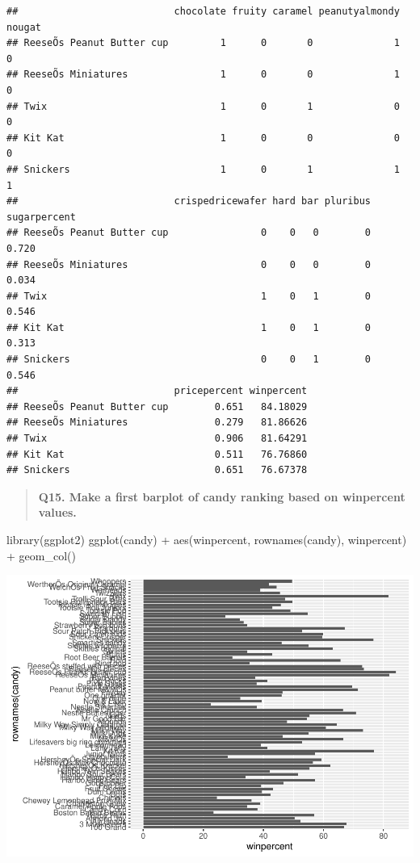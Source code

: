 \documentclass[
]{article}
\newenvironment{Shaded}{\begin{snugshade}}{\end{snugshade}}
\newcommand{\FunctionTok}[1]{\textcolor[rgb]{0.00,0.00,0.00}{#1}}
\newcommand{\NormalTok}[1]{#1}
\newcommand{\SpecialCharTok}[1]{\textcolor[rgb]{0.00,0.00,0.00}{#1}}
\begin{document}
\begin{verbatim}
##                           chocolate fruity caramel peanutyalmondy nougat
## ReeseÕs Peanut Butter cup         1      0       0              1      0
## ReeseÕs Miniatures                1      0       0              1      0
## Twix                              1      0       1              0      0
## Kit Kat                           1      0       0              0      0
## Snickers                          1      0       1              1      1
##                           crispedricewafer hard bar pluribus sugarpercent
## ReeseÕs Peanut Butter cup                0    0   0        0        0.720
## ReeseÕs Miniatures                       0    0   0        0        0.034
## Twix                                     1    0   1        0        0.546
## Kit Kat                                  1    0   1        0        0.313
## Snickers                                 0    0   1        0        0.546
##                           pricepercent winpercent
## ReeseÕs Peanut Butter cup        0.651   84.18029
## ReeseÕs Miniatures               0.279   81.86626
## Twix                             0.906   81.64291
## Kit Kat                          0.511   76.76860
## Snickers                         0.651   76.67378
\end{verbatim}

\begin{quote}
\textbf{Q15. Make a first barplot of candy ranking based on winpercent
values.}
\end{quote}

\begin{Shaded}
\begin{Highlighting}[]
\FunctionTok{library}\NormalTok{(ggplot2)}
\FunctionTok{ggplot}\NormalTok{(candy) }\SpecialCharTok{+} 
  \FunctionTok{aes}\NormalTok{(winpercent, }\FunctionTok{rownames}\NormalTok{(candy), winpercent) }\SpecialCharTok{+}
  \FunctionTok{geom\_col}\NormalTok{()}
\end{Highlighting}
\end{Shaded}

\includegraphics{Class-10-Halloween-Candy_files/figure-latex/unnamed-chunk-15-1.pdf}
\end{document}
